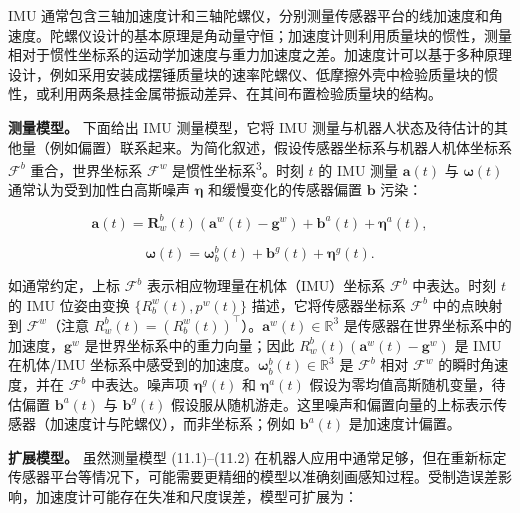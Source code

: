 IMU 通常包含三轴加速度计和三轴陀螺仪，分别测量传感器平台的线加速度和角速度。陀螺仪设计的基本原理是角动量守恒；加速度计则利用质量块的惯性，测量相对于惯性坐标系的运动学加速度与重力加速度之差。加速度计可以基于多种原理设计，例如采用安装成摆锤质量块的速率陀螺仪、低摩擦外壳中检验质量块的惯性，或利用两条悬挂金属带振动差异、在其间布置检验质量块的结构。

\textbf{测量模型。} 下面给出 IMU 测量模型，它将 IMU 测量与机器人状态及待估计的其他量（例如偏置）联系起来。为简化叙述，假设传感器坐标系与机器人机体坐标系 $\mathcal { F } ^ { b }$ 重合，世界坐标系 $\mathcal { F } ^ { w }$ 是惯性坐标系\textsuperscript{3}。时刻 $t$ 的 IMU 测量 $\mathbf{a}(t)$ 与 $\boldsymbol\omega(t)$ 通常认为受到加性白高斯噪声 $\boldsymbol\eta$ 和缓慢变化的传感器偏置 $\mathbf b$ 污染：

\begin{equation}
\mathbf {a} (t) = \boldsymbol {R} _ {w} ^ {b} (t) \left(\mathbf {a} ^ {w} (t) - \mathbf {g} ^ {w}\right) + \mathbf {b} ^ {a} (t) + \boldsymbol {\eta} ^ {a} (t),\tag{11.1}
\end{equation}

\begin{equation}
\boldsymbol {\omega} (t) = \boldsymbol {\omega} _ {b} ^ {b} (t) + \mathbf {b} ^ {g} (t) + \boldsymbol {\eta} ^ {g} (t).\tag{11.2}
\end{equation}

如通常约定，上标 $\mathcal { F } ^ { b }$ 表示相应物理量在机体（IMU）坐标系 $\mathcal { F } ^ { b }$ 中表达。时刻 $t$ 的 IMU 位姿由变换 $\{R_b^w(t),p^w(t)\}$ 描述，它将传感器坐标系 $\mathcal { F } ^ { b }$ 中的点映射到 $\mathcal { F } ^ { w }$（注意 $R_w^b(t)=(R_b^w(t))^\top$）。$\mathbf a^w(t)\in\mathbb{R}^3$ 是传感器在世界坐标系中的加速度，$\mathbf g^w$ 是世界坐标系中的重力向量；因此 $R_w^b(t)(\mathbf a^w(t)-\mathbf g^w)$ 是 IMU 在机体/IMU 坐标系中感受到的加速度。$\boldsymbol\omega_b^b(t)\in\mathbb{R}^3$ 是 $\mathcal { F } ^ { b }$ 相对 $\mathcal { F } ^ { w }$ 的瞬时角速度，并在 $\mathcal { F } ^ { b }$ 中表达。噪声项 $\boldsymbol\eta^g(t)$ 和 $\boldsymbol\eta^a(t)$ 假设为零均值高斯随机变量，待估偏置 $\mathbf b^a(t)$ 与 $\mathbf b^g(t)$ 假设服从随机游走。这里噪声和偏置向量的上标表示传感器（加速度计与陀螺仪），而非坐标系；例如 $\mathbf b^a(t)$ 是加速度计偏置。

\textbf{扩展模型。} 虽然测量模型 (11.1)--(11.2) 在机器人应用中通常足够，但在重新标定传感器平台等情况下，可能需要更精细的模型以准确刻画感知过程。受制造误差影响，加速度计可能存在失准和尺度误差，模型可扩展为：

